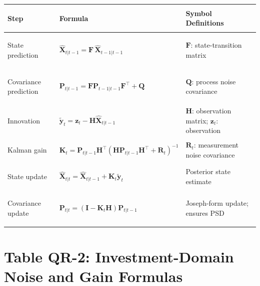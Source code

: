 \documentclass[12pt,openany]{book}
\numberwithin{equation}{chapter}
\theoremstyle{plain}
\theoremstyle{definition}
\theoremstyle{remark}
\renewcommand{\arraystretch}{1.2}
\begin{document}
\begin{center}
\small
\renewcommand{\arraystretch}{1.40}
\begin{tabularx}{\linewidth}{@{}
  >{\bfseries\raggedright\arraybackslash}p{3.0cm}
  >{\raggedright\arraybackslash}p{4.8cm}
  >{\raggedright\arraybackslash}X
@{}}
\toprule
Step & Formula & Symbol Definitions \\
\midrule
State prediction &
$\hat{\mathbf{X}}_{t|t-1} = \mathbf{F}\,\hat{\mathbf{X}}_{t-1|t-1}$ &
$\mathbf{F}$: state-transition matrix \\
Covariance prediction &
$\mathbf{P}_{t|t-1} = \mathbf{F}\mathbf{P}_{t-1|t-1}\mathbf{F}^\top + \mathbf{Q}$ &
$\mathbf{Q}$: process noise covariance \\
Innovation &
$\tilde{\mathbf{y}}_t = \mathbf{z}_t - \mathbf{H}\hat{\mathbf{X}}_{t|t-1}$ &
$\mathbf{H}$: observation matrix; $\mathbf{z}_t$: observation \\
Kalman gain &
$\mathbf{K}_t = \mathbf{P}_{t|t-1}\mathbf{H}^\top(\mathbf{H}\mathbf{P}_{t|t-1}\mathbf{H}^\top + \mathbf{R}_t)^{-1}$ &
$\mathbf{R}_t$: measurement noise covariance \\
State update &
$\hat{\mathbf{X}}_{t|t} = \hat{\mathbf{X}}_{t|t-1} + \mathbf{K}_t\tilde{\mathbf{y}}_t$ &
Posterior state estimate \\
Covariance update &
$\mathbf{P}_{t|t} = (\mathbf{I} - \mathbf{K}_t\mathbf{H})\mathbf{P}_{t|t-1}$ &
Joseph-form update; ensures PSD \\
\bottomrule
\end{tabularx}
\end{center}

\section*{Table QR-2: Investment-Domain Noise and Gain Formulas}
\end{document}
